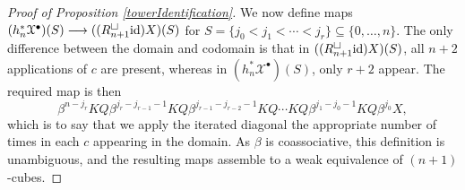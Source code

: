 \documentclass[11pt]{amsart} \renewcommand{\baselinestretch}{1.2}
\theoremstyle{plain}
\numberwithin{equation}{section} %
\theoremstyle{plain}
\numberwithin{equation}{chapter} %
\renewcommand{\to}{\longrightarrow}
\newcommand{\calx}{\mathcal{X}}
\newcommand{\Id}{\mathrm{id}}
\newcommand{\plainD}{R}
\begin{document}
\begin{Bousfield-Kan spectral sequence}
\begin{proof}[Proof of Proposition \ref{towerIdentification}]
We now define maps $(h_n^*\calx^\bullet)(S)\to (({\plainD}_{n+1}^{\smash{\square}}\Id )X)(S)$ for $S=\{j_0<j_1<\cdots<j_r\}\subseteq\{0,\ldots,n\}$. 
The only difference between the domain and codomain is that in $(({\plainD}_{n+1}^{\smash{\square}}\Id )X)(S)$, all $n+2$ applications of $c$ are present, whereas in $(h_n^*\calx^\bullet)(S)$, only $r+2$ appear. The required map is then
\[\beta^{n-j_r}KQ\beta^{j_r-j_{r-1}-1}KQ\beta^{j_{r-1}-j_{r-2}-1}KQ\cdots KQ\beta^{j_{1}-j_0-1}KQ\beta^{j_0}X,\]
which is to say that we apply the iterated diagonal the appropriate number of times in each $c$ appearing in the domain. As $\beta$ is coassociative, this definition is unambiguous, and the resulting maps assemble to a weak equivalence of $(n+1)$-cubes. 
\end{proof}




\end{Bousfield-Kan spectral sequence}
\end{document}
